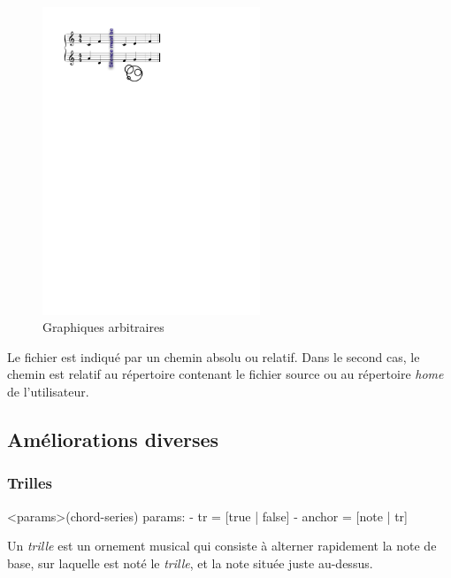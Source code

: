 \documentclass{article}
\newenvironment{gmncode}	{\vspace{-2mm}\small\verbatim}{\endverbatim\vspace{-2mm}}
\begin{document}
\begin{figure}[h]
\centering
\includegraphics[width=65mm]{img/partitions/symbol.pdf}
\caption{Graphiques arbitraires}
\label{fig:symbol}
\end{figure}

Le fichier est indiqué par un chemin absolu ou relatif. Dans le second cas, le chemin est relatif au répertoire contenant le fichier source ou au répertoire \emph{home} de l'utilisateur.



\subsection{Améliorations diverses}\label{subsec:amelioraions}


\subsubsection{Trilles}\label{subsubsec:trilles}


\begin{gmncode}
  \trill<params>(chord-series)
   params:
    - tr = [true | false]
    - anchor = [note | tr]
\end{gmncode}

Un \emph{trille} est un ornement musical qui consiste à alterner rapidement la note de base, sur laquelle est noté le \emph{trille}, et la note située juste au-dessus.
\end{document}
